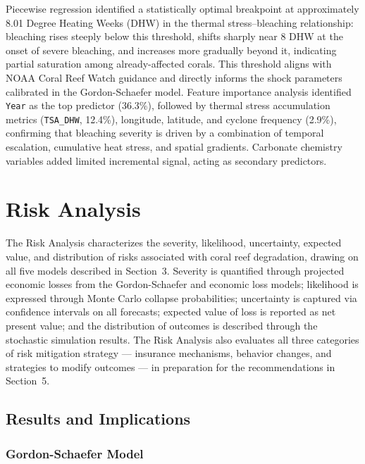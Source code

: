 \documentclass[10pt,letterpaper]{article}
\begin{document}
Piecewise regression identified a statistically optimal breakpoint at approximately 8.01 Degree Heating Weeks (DHW) in the thermal stress--bleaching relationship: bleaching rises steeply below this threshold, shifts sharply near 8 DHW at the onset of severe bleaching, and increases more gradually beyond it, indicating partial saturation among already-affected corals. This threshold aligns with NOAA Coral Reef Watch guidance \cite{noaa_crw} and directly informs the shock parameters calibrated in the Gordon-Schaefer model. Feature importance analysis identified \texttt{Year} as the top predictor (36.3\%), followed by thermal stress accumulation metrics (\texttt{TSA\_DHW}, 12.4\%), longitude, latitude, and cyclone frequency (2.9\%), confirming that bleaching severity is driven by a combination of temporal escalation, cumulative heat stress, and spatial gradients. Carbonate chemistry variables added limited incremental signal, acting as secondary predictors.

\section{Risk Analysis}

The Risk Analysis characterizes the severity, likelihood, uncertainty, expected value, and distribution of risks associated with coral reef degradation, drawing on all five models described in Section~3. Severity is quantified through projected economic losses from the Gordon-Schaefer and economic loss models; likelihood is expressed through Monte Carlo collapse probabilities; uncertainty is captured via confidence intervals on all forecasts; expected value of loss is reported as net present value; and the distribution of outcomes is described through the stochastic simulation results. The Risk Analysis also evaluates all three categories of risk mitigation strategy --- insurance mechanisms, behavior changes, and strategies to modify outcomes --- in preparation for the recommendations in Section~5.

\subsection{Results and Implications}

\subsubsection{Gordon-Schaefer Model}
\end{document}
